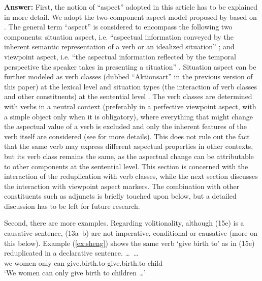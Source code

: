 \documentclass[fleqn,twoside]{article}
\begin{document}
\begin{enumerate}
\noindent
\textbf{Answer:}\label{verbclass}
First, the notion of ``aspect'' adopted in this article has to be explained in more detail.
We adopt the two-component aspect model proposed by \citet{XiaoMcEnery2004} based on \citet{Smith1991}.
The general term ``aspect'' is considered to encompass the following two components:
situation aspect, i.e. ``aspectual information conveyed by the inherent semantic representation of a verb or an idealized situation'' \citep[21]{XiaoMcEnery2004};
and viewpoint aspect, i.e. ``the aspectual information reflected by the temporal perspective the speaker takes in presenting a situation'' \citep[21]{XiaoMcEnery2004}.
Situation aspect can be further modeled as verb classes (dubbed ``Aktionsart'' in the previous version of this paper) at the lexical level
and situation types (the interaction of verb classes and other constituents) at the sentential level \citep[33]{XiaoMcEnery2004}.
The verb classes are determined with verbs in a neutral context (preferably in a perfective viewpoint aspect, with a simple object only when it is obligatory),
where everything that might change the aspectual value of a verb is excluded
and only the inherent features of the verb itself are considered
(see \citealt[52]{XiaoMcEnery2004} for more details).
This does not rule out the fact that the same verb may express different aspectual properties in other contexts,
but its verb class remains the same,
as the aspectual change can be attributable to other components at the sentential level.
This section is concerned with the interaction of the reduplication with verb classes,
while the next section discusses the interaction with viewpoint aspect markers.
The combination with other constituents such as adjuncts is briefly touched upon below,
but a detailed discussion has to be left for future research.

Second, there are more examples.
Regarding volitionality, although (15e) is a causative sentence, (13a--b) are not imperative, conditional or causative (more on this below).
Example (\ref{ex:sheng}) shows the same verb  `give birth to' as in (15e) reduplicated in a declarative sentence.
\ea\label{ex:sheng}%
\gll {}  \ldots\,     \ldots \\
we women {} only can give.birth.to-give.birth.to child\\
\glt `We women can only give birth to children \ldots'
\z


\end{enumerate}
\end{document}
